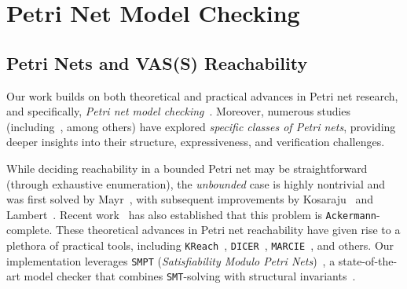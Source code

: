 \clearpage

\section{Petri Net Model Checking}
\label{appendix:smpt}


\subsection{Petri Nets and VAS(S) Reachability}
	
	Our work builds on both theoretical and practical advances in 
	Petri net research, and specifically, \textit{Petri net model checking}~\cite{Mu89,Es96,Re12,EsNi24,DuLaSr25,HuScReAb17,AmBeDo14,PiHaRe20,Wo18}.
	Moreover, numerous studies (including~\cite{LiWaChSuZh02,Zu91,AkChDaJaSa17,AnPePe13,AnBeCh16,EtChRo16,AnBeCh14}, among others) have explored \textit{specific classes of Petri nets}, providing deeper insights into their structure, expressiveness, and verification challenges.
	
	
	\medskip
	While deciding reachability in a bounded Petri net may be straightforward (through exhaustive enumeration), the \textit{unbounded} case is highly nontrivial and was first solved by 
	Mayr~\cite{Ma81}, with subsequent improvements by Kosaraju~\cite{Ko82} and 
	Lambert~\cite{La92}. Recent work~\cite{CzWo22,Le22} has also established that this 
	problem is \texttt{Ackermann}-complete.
	These theoretical advances in Petri net reachability have given rise to a 
	plethora of practical tools, including \texttt{KReach}~\cite{DiLa20}, 
	\texttt{DICER}~\cite{XiZhLi21}, \texttt{MARCIE}~\cite{HeRoSc13}, and others. 
	Our implementation leverages \texttt{SMPT} (\emph{Satisfiability Modulo Petri Nets})~\cite{AmDa23}, a state-of-the-art model checker that combines \texttt{SMT}-solving with structural invariants~\cite{AmBeDa21,amat2022polyhedral}.
	
